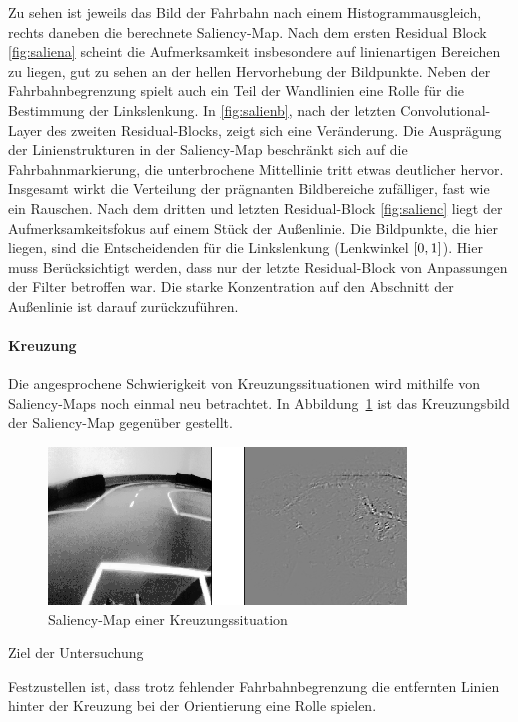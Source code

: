 Zu sehen ist jeweils das Bild der Fahrbahn nach einem Histogrammausgleich, rechts daneben die berechnete Saliency-Map. Nach dem ersten Residual Block \ref{fig:saliena} scheint die Aufmerksamkeit insbesondere auf linienartigen Bereichen zu liegen, gut zu sehen an der hellen Hervorhebung der Bildpunkte. Neben der Fahrbahnbegrenzung spielt auch ein Teil der Wandlinien eine Rolle für die Bestimmung der Linkslenkung. In \ref{fig:salienb}, nach der letzten Convolutional-Layer des zweiten Residual-Blocks, zeigt sich eine Veränderung. Die Ausprägung der Linienstrukturen in der Saliency-Map beschränkt sich auf die Fahrbahnmarkierung, die unterbrochene Mittellinie tritt etwas deutlicher hervor. Insgesamt wirkt die Verteilung der prägnanten Bildbereiche zufälliger, fast wie ein Rauschen.
Nach dem dritten und letzten Residual-Block \ref{fig:salienc} liegt der Aufmerksamkeitsfokus auf einem Stück der Außenlinie.  Die Bildpunkte, die hier liegen, sind die Entscheidenden für die Linkslenkung (Lenkwinkel $\interval{0}{1}$). Hier muss Berücksichtigt werden, dass nur der letzte Residual-Block von Anpassungen der Filter betroffen war. Die starke Konzentration auf den Abschnitt der Außenlinie ist darauf zurückzuführen.

\paragraph{Kreuzung}
Die angesprochene Schwierigkeit von Kreuzungssituationen wird mithilfe von Saliency-Maps noch einmal neu betrachtet. In Abbildung~\ref{img:kreuzung} ist das Kreuzungsbild der Saliency-Map gegenüber gestellt.

\begin{figure}[h]
	\centering
	\includegraphics[scale=1.3]{figures/Kreuzung.png}
	\caption{Saliency-Map einer Kreuzungssituation}
	\label{img:kreuzung}
\end{figure}

Ziel der Untersuchung 

Festzustellen ist, dass trotz fehlender Fahrbahnbegrenzung die entfernten Linien hinter der Kreuzung bei der Orientierung eine Rolle spielen.  


